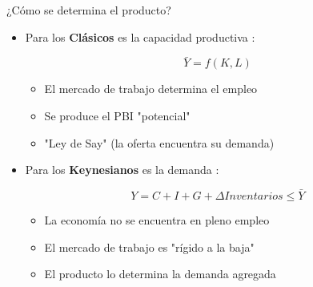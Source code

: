 \documentclass{beamer}
\begin{document}
\begin{frame}{¿Cómo se determina el producto?}

    \begin{itemize}
        \item Para los \textbf{Clásicos} es la capacidad productiva \faCogs:
            \begin{center}
            \begin{boxA}
                    $$ \bar{Y}=f(K, L) $$
             \end{boxA}
             \end{center}
             
            \begin{itemize}
                \item El mercado de trabajo determina el empleo
                \item Se produce el PBI "potencial"
                \item "Ley de Say" (la oferta encuentra su demanda)
            \end{itemize}
        
        \item Para los \textbf{Keynesianos} es la demanda \faShoppingBasket:
            
            \begin{center}
            \begin{boxA}
                    $$ Y = C + I + G + \Delta Inventarios \leq \bar{Y} $$
             \end{boxA}
             \end{center}
             
            \begin{itemize}
                \item La economía no se encuentra en pleno empleo
                \item El mercado de trabajo es "rígido a la baja"
                \item El producto lo determina la demanda agregada
            \end{itemize}
    \end{itemize}
\end{frame}
\end{document}
